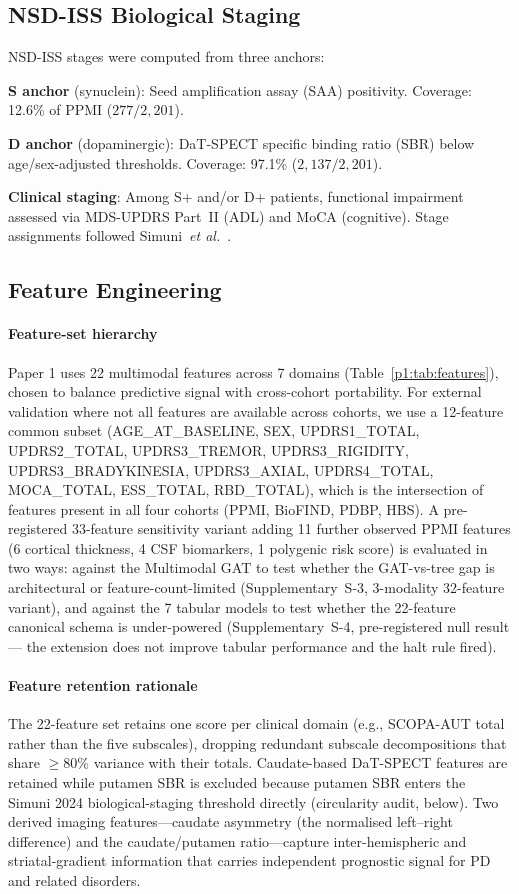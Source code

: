 \subsection{NSD-ISS Biological Staging}
NSD-ISS stages were computed from three anchors:

\textbf{S anchor} (synuclein): Seed amplification assay (SAA) positivity. Coverage: 12.6\% of PPMI ($277/2{,}201$).

\textbf{D anchor} (dopaminergic): DaT-SPECT specific binding ratio (SBR) below age/sex-adjusted thresholds. Coverage: 97.1\% ($2{,}137/2{,}201$).

\textbf{Clinical staging}: Among S+ and/or D+ patients, functional impairment assessed via MDS-UPDRS Part~II (ADL) and MoCA (cognitive). Stage assignments followed Simuni~\textit{et al.}~\cite{simuni2024}.

\subsection{Feature Engineering}
\label{p1:sec:methods:features}

\paragraph*{Feature-set hierarchy} Paper 1 uses 22 multimodal features across 7 domains (Table~\ref{p1:tab:features}), chosen to balance predictive signal with cross-cohort portability. For external validation where not all features are available across cohorts, we use a 12-feature common subset (AGE\_AT\_BASELINE, SEX, UPDRS1\_TOTAL, UPDRS2\_TOTAL, UPDRS3\_TREMOR, UPDRS3\_RIGIDITY, UPDRS3\_BRADYKINESIA, UPDRS3\_AXIAL, UPDRS4\_TOTAL, MOCA\_TOTAL, ESS\_TOTAL, RBD\_TOTAL), which is the intersection of features present in all four cohorts (PPMI, BioFIND, PDBP, HBS). A pre-registered 33-feature sensitivity variant adding 11 further observed PPMI features (6 cortical thickness, 4 CSF biomarkers, 1 polygenic risk score) is evaluated in two ways: against the Multimodal GAT to test whether the GAT-vs-tree gap is architectural or feature-count-limited (Supplementary~S-3, 3-modality 32-feature variant), and against the 7 tabular models to test whether the 22-feature canonical schema is under-powered (Supplementary~S-4, pre-registered null result --- the extension does not improve tabular performance and the halt rule fired).

\paragraph*{Feature retention rationale} The 22-feature set retains one score per clinical domain (e.g., SCOPA-AUT total rather than the five subscales), dropping redundant subscale decompositions that share $\geq 80\%$ variance with their totals. Caudate-based DaT-SPECT features are retained while putamen SBR is excluded because putamen SBR enters the Simuni 2024 biological-staging threshold directly (circularity audit, below). Two derived imaging features---caudate asymmetry (the normalised left--right difference) and the caudate/putamen ratio---capture inter-hemispheric and striatal-gradient information that carries independent prognostic signal for PD and related disorders.

